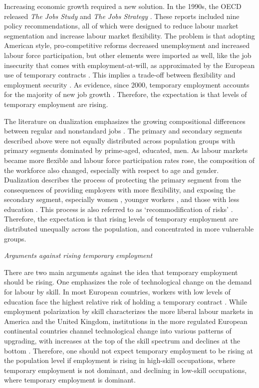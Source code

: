 \documentclass[12pt]{article}
\begin{document}
Increasing economic growth required a new solution.  In the 1990s, the OECD released \emph{The Jobs Study} \citeyearpar{oecd_1994} and \emph{The Jobs Strategy} \citeyearpar{oecd_1996}.  These reports included nine policy recommendations, all of which were designed to reduce labour market segmentation and increase labour market flexibility.  The problem is that adopting American style, pro-competitive reforms decreased unemployment and increased labour force participation, but other elements were imported as well, like the job insecurity that comes with employment-at-will, as approximated by the European use of temporary contracts \citep{oecd_2006}.  This implies a trade-off between flexibility and employment security \citep{muffels_2014}.  As evidence, since 2000, temporary employment accounts for the majority of new job growth \citep[Fig. 6]{eurofound_2015}.  Therefore, the expectation is that levels of temporary employment are rising. 

The literature on dualization emphasizes the growing compositional differences between regular and nonstandard jobs \citep{emmenegger_etal_2012}.  The primary and secondary segments described above were not equally distributed across population groups with primary segments dominated by prime-aged, educated, men.  As labour markets became more flexible and labour force participation rates rose, the composition of the workforce also changed, especially with respect to age and gender.  Dualization describes the process of protecting the primary segment from the consequences of providing employers with more flexibility, and exposing the secondary segment, especially women \citep{gash_mcginnity_2007}, younger workers \citep{allmendinger_etal_2013}, and those with less education \citep{gebel_giesecke_2009}.  This process is also referred to as `recommodification of risks' \citep{breen_1997}.  Therefore, the expectation is that rising levels of temporary employment are distributed unequally across the population, and concentrated in more vulnerable groups. 

\emph{Arguments against rising temporary employment}

There are two main arguments against the idea that temporary employment should be rising.  One emphasizes the role of technological change on the demand for labour by skill.  In most European countries, workers with low levels of education face the highest relative risk of holding a temporary contract \citep{gebel_giesecke_2016}.  While employment polarization by skill characterizes the more liberal labour markets in America and the United Kingdom, institutions in the more regulated European continental countries channel technological change into various patterns of upgrading, with increases at the top of the skill spectrum and declines at the bottom \citep{oesch_piccitto_2019}.  Therefore, one should not expect temporary employment to be rising at the population level if employment is rising in high-skill occupations, where temporary employment is not dominant, and declining in low-skill occupations, where temporary employment is dominant.
\end{document}
